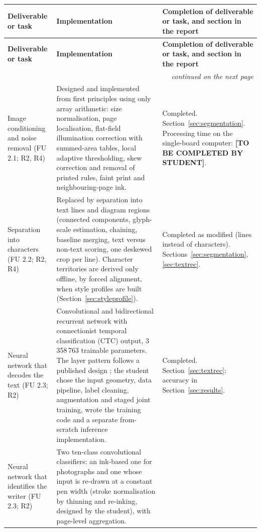 {
\fontsize{9.5}{11.5}\selectfont
\setlength{\tabcolsep}{4pt}
\renewcommand{\arraystretch}{1.05}
\begin{longtable}{|p{3.3cm}|p{7.0cm}|p{4.3cm}|}
\hline
\textbf{Deliverable or task} & \textbf{Implementation} & \textbf{Completion of deliverable or task, and section in the report} \\
\hline
\endfirsthead
\hline
\textbf{Deliverable or task} & \textbf{Implementation} & \textbf{Completion of deliverable or task, and section in the report} \\
\hline
\endhead
\hline
\multicolumn{3}{r}{\emph{continued on the next page}}\\
\endfoot
\hline
\endlastfoot
Image conditioning and noise removal (FU 2.1; R2, R4) &
Designed and implemented from first principles using only array arithmetic: size normalisation, page localisation, flat-field illumination correction with summed-area tables, local adaptive thresholding, skew correction and removal of printed rules, faint print and neighbouring-page ink. &
Completed. Section~\ref{sec:segmentation}. Processing time on the single-board computer: \textbf{[TO BE COMPLETED BY STUDENT]}. \\
\hline
Separation into characters (FU 2.2; R2, R4) &
Replaced by separation into text lines and diagram regions (connected components, glyph-scale estimation, chaining, baseline merging, text versus non-text scoring, one deskewed crop per line). Character territories are derived only offline, by forced alignment, when style profiles are built (Section~\ref{sec:styleprofile}). &
Completed as modified (lines instead of characters). Sections~\ref{sec:segmentation}, \ref{sec:textrec}. \\
\hline
Neural network that decodes the text (FU 2.3; R2) &
Convolutional and bidirectional recurrent network with connectionist temporal classification (CTC) output, 3\,358\,763 trainable parameters. The layer pattern follows a published design \cite{kizilirmak2023}; the student chose the input geometry, data pipeline, label cleaning, augmentation and staged joint training, wrote the training code and a separate from-scratch inference implementation. &
Completed. Section~\ref{sec:textrec}; accuracy in Section~\ref{sec:results}. \\
\hline
Neural network that identifies the writer (FU 2.3; R2) &
Two ten-class convolutional classifiers: an ink-based one for photographs and one whose input is re-drawn at a constant pen width (stroke normalisation by thinning and re-inking, designed by the student), with page-level aggregation. &

\end{longtable}}
